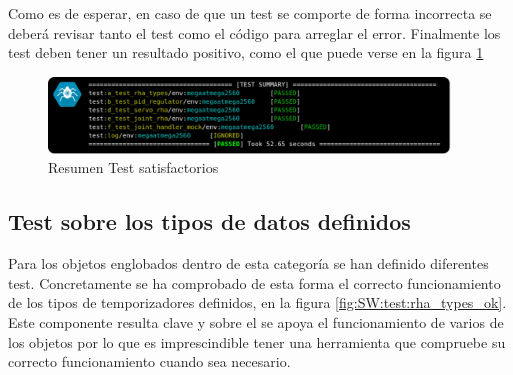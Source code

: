    Como es de esperar, en caso de que un test se comporte de forma incorrecta se deberá revisar tanto el test como el código para arreglar el error. Finalmente los test deben tener un resultado positivo, como el que puede verse en la figura \ref{fig:SW:test:sum_ok}

    \begin{figure}[H]
        \centering
        \includegraphics[width=0.95\textwidth]{figuras/Imagenes_SW/test/SWTest_8.jpg}
        \caption{Resumen Test satisfactorios}
        \label{fig:SW:test:sum_ok}
    \end{figure}

    \subsection{Test sobre los tipos de datos definidos}
        Para los objetos englobados dentro de esta categoría se han definido diferentes test. Concretamente se ha comprobado de esta forma el correcto funcionamiento de los tipos de temporizadores definidos, en la figura \ref{fig:SW:test:rha_types_ok}. Este componente resulta clave y sobre el se apoya el funcionamiento de varios de los objetos por lo que es imprescindible tener una herramienta que compruebe su correcto funcionamiento cuando sea necesario.
        \\
        
